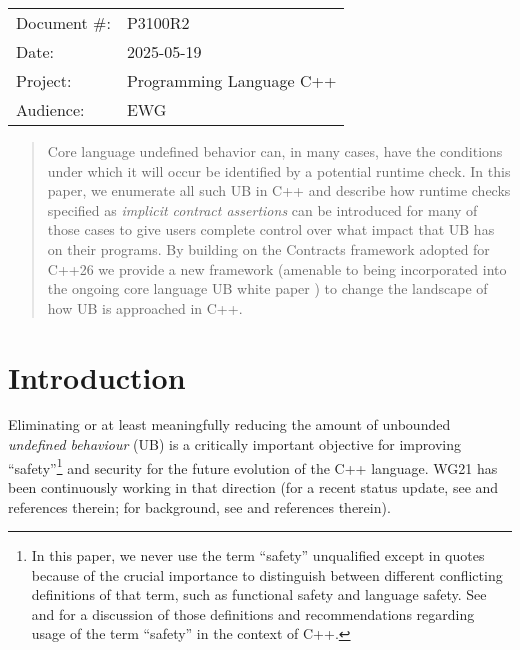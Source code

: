 \begin{tabular}{ll}
Document \#: & P3100R2 \\
Date: &2025-05-19 \\
Project: & Programming Language C++ \\
Audience: & EWG
\end{tabular}

\begin{abstract}
Core language undefined behavior can, in many cases, have the conditions under which it will occur be identified by a potential runtime check.  In this paper, we enumerate all such UB in C++ and describe how runtime checks specified as \emph{implicit contract assertions} can be introduced for many of those cases to give users complete control over what impact that UB has on their programs.   By building on the Contracts framework adopted for C++26 we provide a new framework (amenable to being incorporated into the ongoing core language UB white paper \cite{P3656R1}) to change the landscape of how UB is approached in C++.
\end{abstract}


\tableofcontents*
\pagebreak






\section{Introduction}
\label{intro}

Eliminating or at least meaningfully reducing the amount of unbounded \emph{undefined behaviour} (UB) is a critically important objective for improving ``safety''\footnote{In this paper, we never use the term ``safety'' unqualified except in quotes because of the crucial importance to distinguish between different conflicting definitions of that term, such as functional safety and language safety.  See \cite{P3500R1} and \cite{P3578R0} for a discussion of those definitions and recommendations regarding usage of the term ``safety'' in the context of C++.}
and security for the future evolution of the C++ language. WG21 has been continuously working in that direction (for a recent status update, see \cite{Sutter2025} and references therein; for background, see \cite{Sutter2024} and references therein).

